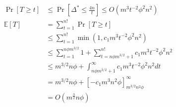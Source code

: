 \documentclass[12pt, a4paper]{article}
\begin{document}
\begin{align*}
    \Pr[T \geq t] &\leq \Pr\left[\Delta^* \leq \frac{4n}{t}\right] \leq O(m^3 t^{-2} \phi^2 n^2)\\
    \mathbb{E}[T] &= \displaystyle\sum_{t = 1} ^{n!} \Pr[T \geq t]\\
    &\leq \displaystyle\sum_{t = 1} ^{n!} \min(1, c_1 m^3 t^{-2} \phi^2 n^2)\\
    &\leq \displaystyle\sum_{t = 1} ^{n \phi m^{3/2}} 1 + \displaystyle\sum_{t = n \phi m^{3/2} + 1} ^{n!} c_1 m^3 t^{-2} \phi^2 n^2\\
    &\leq m^{3/2} n \phi + \int_{n \phi m^{3/2} + 1}^{\infty} c_1 m^3 t^{-2} \phi^2 n^2 dt\\
    &= m^{3/2} n \phi + \left[ - c_1m^3n^2 \phi \right]_{m^{3/2}n^2 \phi} ^{\infty}\\
    &= O(m^{\frac{3}{2}}n \phi)
\end{align*}
\end{document}
